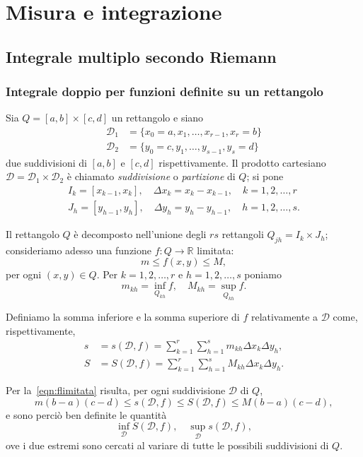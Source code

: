 \documentclass[a4paper]{book}
\numberwithin{equation}{section}
\theoremstyle{plain}
\theoremstyle{definition}
\theoremstyle{remark}
\theoremstyle{example}
\begin{document}
\chapter{Misura e integrazione}
\section{Integrale multiplo secondo Riemann}
\subsection{Integrale doppio per funzioni definite su un rettangolo}
Sia $Q = [a, b] \times [c, d]$ un rettangolo e siano
	\begin{align*}
	\mathcal{D}_1 &= \{ x_0 = a, x_1, \dots, x_{r-1}, x_r = b\} \\
	\mathcal{D}_2 &= \{ y_0 = c, y_1, \dots, y_{s-1}, y_s = d \}
	\end{align*}
due suddivisioni di $[a, b]$ e $[c, d]$ rispettivamente. Il prodotto cartesiano $\mathcal{D} = \mathcal{D}_1 \times \mathcal{D}_2$ è chiamato \emph{suddivisione} o \emph{partizione} di $Q$; si pone
	\begin{align*}
	I_k = [x_{k-1}, x_k], \quad \Delta x_k = x_k - x_{k-1}, \quad k = 1, 2, \dots, r \\
	J_h = [y_{h-1}, y_h], \quad \Delta y_h = y_h - y_{h-1}, \quad h = 1, 2, \dots, s.
	\end{align*}

Il rettangolo $Q$ è decomposto nell'unione degli $rs$ rettangoli $Q_{jh} = I_k \times J_h$; consideriamo adesso una funzione $f \colon Q \to \mathbb{R}$ limitata:
	\begin{equation}
	\label{eqn:flimitata}
	m \le f(x, y) \le M,
	\end{equation}
per ogni $(x, y) \in Q$.
Per $k = 1, 2, \dots, r$ e $h = 1, 2, \dots, s$ poniamo
	\begin{equation}
	m_{kh} = \inf_{Q_{kh}}f, \quad M_{kh} = \sup_{Q_{kh}} f.
	\end{equation}

Definiamo la somma inferiore e la somma superiore di $f$ relativamente a $\mathcal{D}$ come, rispettivamente,
	\begin{align*}
	s &= s(\mathcal{D}, f) = \sum_{k=1}^r\sum_{h=1}^s m_{kh}\Delta x_k \Delta y_h, \\
	S &= S(\mathcal{D}, f) = \sum_{k=1}^r \sum_{h=1}^s M_{kh} \Delta x_k \Delta y_h.
	\end{align*}

Per la~\eqref{eqn:flimitata} risulta, per ogni suddivisione $\mathcal{D}$ di $Q$,
	\begin{equation*}
	m(b -a )(c-d) \le s(\mathcal{D}, f) \le S(\mathcal{D}, f) \le M(b-a)(c-d),
	\end{equation*}
e sono perciò ben definite le quantità
	\begin{equation*}
	\inf_{\mathcal{D}}S(\mathcal{D}, f), \quad \sup_{\mathcal{D}}s(\mathcal{D}, f),
	\end{equation*}
ove i due estremi sono cercati al variare di tutte le possibili suddivisioni di $Q$.
\end{document}
